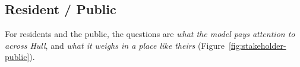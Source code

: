\subsection{Resident / Public}
For residents and the public, the questions are \emph{what the model pays attention to across
Hull}, and \emph{what it weighs in a place like theirs} (Figure~\ref{fig:stakeholder-public}).\par\medskip
%


